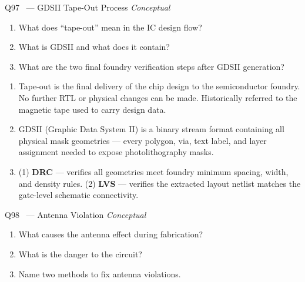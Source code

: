 \documentclass[12pt,a4paper]{article}
\newcommand{\advanced}{%
  \fbox{\textcolor{advred}{\bfseries\sffamily\small ADVANCED}}}
\newcommand{\moderate}{%
  \fbox{\textcolor{modoran}{\bfseries\sffamily\small MODERATE}}}
\begin{document}
\begin{questionbox}{Q97 \moderate\ --- GDSII Tape-Out Process \hfill\textit{Conceptual}}
\begin{enumerate}[label=\textbf{\alph*)}]
  \item What does ``tape-out'' mean in the IC design flow?
  \item What is GDSII and what does it contain?
  \item What are the two final foundry verification steps after GDSII generation?
\end{enumerate}
\end{questionbox}

\begin{answerbox}
\begin{enumerate}[label=\textbf{\alph*)}]
  \item Tape-out is the final delivery of the chip design to the semiconductor foundry. No further RTL or physical changes can be made. Historically referred to the magnetic tape used to carry design data.
  \item GDSII (Graphic Data System II) is a binary stream format containing all physical mask geometries --- every polygon, via, text label, and layer assignment needed to expose photolithography masks.
  \item (1) \textbf{DRC} --- verifies all geometries meet foundry minimum spacing, width, and density rules. (2) \textbf{LVS} --- verifies the extracted layout netlist matches the gate-level schematic connectivity.
\end{enumerate}
\end{answerbox}

\begin{questionbox}{Q98 \advanced\ --- Antenna Violation \hfill\textit{Conceptual}}
\begin{enumerate}[label=\textbf{\alph*)}]
  \item What causes the antenna effect during fabrication?
  \item What is the danger to the circuit?
  \item Name two methods to fix antenna violations.
\end{enumerate}
\end{questionbox}
\end{document}
